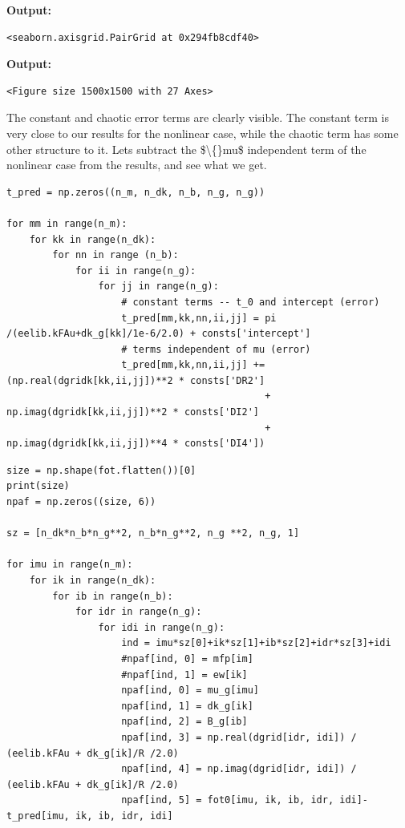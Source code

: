 \documentclass{article}
\begin{document}
\textbf{Output:}\begin{verbatim}
<seaborn.axisgrid.PairGrid at 0x294fb8cdf40>
\end{verbatim}

\textbf{Output:}\begin{verbatim}
<Figure size 1500x1500 with 27 Axes>
\end{verbatim}

The constant and chaotic error terms are clearly visible. The constant term is very close to our results for the nonlinear case, while the chaotic term has some other structure to it. Lets subtract the \$\textbackslash\{\}mu\$ independent term of the nonlinear case from the results, and see what we get.

\begin{lstlisting}
t_pred = np.zeros((n_m, n_dk, n_b, n_g, n_g))

for mm in range(n_m): 
    for kk in range(n_dk):
        for nn in range (n_b):
            for ii in range(n_g):
                for jj in range(n_g):
                    # constant terms -- t_0 and intercept (error)
                    t_pred[mm,kk,nn,ii,jj] = pi /(eelib.kFAu+dk_g[kk]/1e-6/2.0) + consts['intercept']
                    # terms independent of mu (error)
                    t_pred[mm,kk,nn,ii,jj] += (np.real(dgridk[kk,ii,jj])**2 * consts['DR2'] 
                                             + np.imag(dgridk[kk,ii,jj])**2 * consts['DI2'] 
                                             + np.imag(dgridk[kk,ii,jj])**4 * consts['DI4'])\end{lstlisting}

\begin{lstlisting}
size = np.shape(fot.flatten())[0]
print(size)
npaf = np.zeros((size, 6))

sz = [n_dk*n_b*n_g**2, n_b*n_g**2, n_g **2, n_g, 1]

for imu in range(n_m):
    for ik in range(n_dk):
        for ib in range(n_b):
            for idr in range(n_g):
                for idi in range(n_g):
                    ind = imu*sz[0]+ik*sz[1]+ib*sz[2]+idr*sz[3]+idi
                    #npaf[ind, 0] = mfp[im]
                    #npaf[ind, 1] = ew[ik]
                    npaf[ind, 0] = mu_g[imu]
                    npaf[ind, 1] = dk_g[ik]
                    npaf[ind, 2] = B_g[ib]
                    npaf[ind, 3] = np.real(dgrid[idr, idi]) / (eelib.kFAu + dk_g[ik]/R /2.0)
                    npaf[ind, 4] = np.imag(dgrid[idr, idi]) / (eelib.kFAu + dk_g[ik]/R /2.0)
                    npaf[ind, 5] = fot0[imu, ik, ib, idr, idi]-t_pred[imu, ik, ib, idr, idi]\end{lstlisting}
\end{document}
